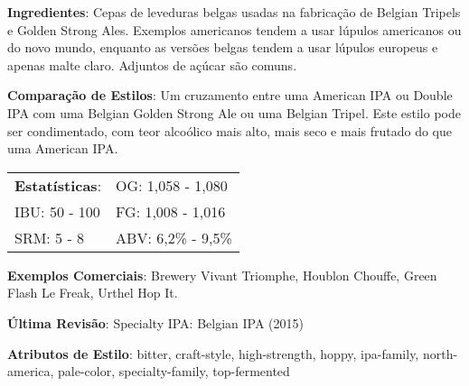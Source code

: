 \textbf{Ingredientes}: Cepas de leveduras belgas usadas na fabricação de Belgian Tripels e Golden Strong Ales. Exemplos americanos tendem a usar lúpulos americanos ou do novo mundo, enquanto as versões belgas tendem a usar lúpulos europeus e apenas malte claro. Adjuntos de açúcar são comuns.

\textbf{Comparação de Estilos}: Um cruzamento entre uma American IPA ou Double IPA com uma Belgian Golden Strong Ale ou uma Belgian Tripel. Este estilo pode ser condimentado, com teor alcoólico mais alto, mais seco e mais frutado do que uma American IPA.

\begin{tabular}{@{}p{35mm}p{35mm}@{}}
  \textbf{Estatísticas}: & OG: 1,058 - 1,080 \\
  IBU: 50 - 100 & FG: 1,008 - 1,016 \\
  SRM: 5 - 8  & ABV: 6,2\% - 9,5\%
\end{tabular}

\textbf{Exemplos Comerciais}: Brewery Vivant Triomphe, Houblon Chouffe, Green Flash Le Freak, Urthel Hop It.

\textbf{Última Revisão}: Specialty IPA: Belgian IPA (2015)

\textbf{Atributos de Estilo}: bitter, craft-style, high-strength, hoppy, ipa-family, north-america, pale-color, specialty-family, top-fermented
